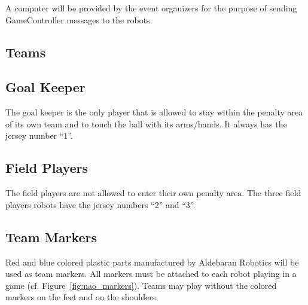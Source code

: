 \documentclass[12pt]{article}
\newcommand{\cf}{\mbox{cf.}\xspace}
\begin{document}
A computer will be provided by the event organizers for the purpose
of sending GameController messages to the robots.

\subsection{Teams}

\subsection{Goal Keeper}
\label{sec:goal_keeper}

The goal keeper is the only player that is allowed to stay within
the penalty area of its own team and to touch the ball with its arms/hands. It always has the jersey number
``1''.

\subsection{Field Players}
\label{sec:field_players}

The field players are not allowed to enter their own penalty area.
The three field players robots have the jersey numbers ``2'' and ``3''.

\subsection{Team Markers}

Red and blue colored plastic parts manufactured by Aldebaran Robotics will be used as team markers. All markers
must be attached to each robot playing in a game (\cf Figure~\ref{fig:nao_markers}). Teams may play without the colored markers on the feet and on the shoulders.
\end{document}
